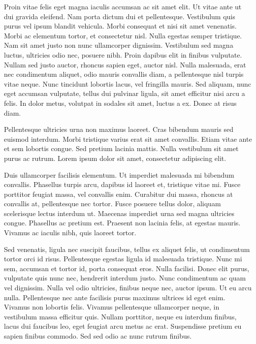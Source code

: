 \documentclass[twocolumn]{IEEEtran}
\begin{document}
Proin vitae felis eget magna iaculis accumsan ac sit amet elit. Ut vitae ante ut dui gravida eleifend. Nam porta dictum dui et pellentesque. Vestibulum quis purus vel ipsum blandit vehicula. Morbi consequat et nisi sit amet venenatis. Morbi ac elementum tortor, et consectetur nisl. Nulla egestas semper tristique. Nam sit amet justo non nunc ullamcorper dignissim. Vestibulum sed magna luctus, ultricies odio nec, posuere nibh. Proin dapibus elit in finibus vulputate. Nullam sed justo auctor, rhoncus sapien eget, auctor nisl. Nulla malesuada, erat nec condimentum aliquet, odio mauris convallis diam, a pellentesque nisl turpis vitae neque. Nunc tincidunt lobortis lacus, vel fringilla mauris. Sed aliquam, nunc eget accumsan vulputate, tellus dui pulvinar ligula, sit amet efficitur nisi arcu a felis. In dolor metus, volutpat in sodales sit amet, luctus a ex. Donec at risus diam.

Pellentesque ultricies urna non maximus laoreet. Cras bibendum mauris sed euismod interdum. Morbi tristique varius erat sit amet convallis. Etiam vitae ante et sem lobortis congue. Sed pretium lacinia mattis. Nulla vestibulum sit amet purus ac rutrum. Lorem ipsum dolor sit amet, consectetur adipiscing elit.

Duis ullamcorper facilisis elementum. Ut imperdiet malesuada mi bibendum convallis. Phasellus turpis arcu, dapibus id laoreet et, tristique vitae mi. Fusce porttitor feugiat massa, vel convallis enim. Curabitur dui massa, rhoncus at convallis at, pellentesque nec tortor. Fusce posuere tellus dolor, aliquam scelerisque lectus interdum ut. Maecenas imperdiet urna sed magna ultricies congue. Phasellus ac pretium est. Praesent non lacinia felis, at egestas mauris. Vivamus ac iaculis nibh, quis laoreet tortor.

Sed venenatis, ligula nec suscipit faucibus, tellus ex aliquet felis, ut condimentum tortor orci id risus. Pellentesque egestas ligula id malesuada tristique. Nunc mi sem, accumsan et tortor id, porta consequat eros. Nulla facilisi. Donec elit purus, vulputate quis nunc nec, hendrerit interdum justo. Nunc condimentum ac quam vel dignissim. Nulla vel odio ultricies, finibus neque nec, auctor ipsum. Ut eu arcu nulla. Pellentesque nec ante facilisis purus maximus ultrices id eget enim. Vivamus non lobortis felis. Vivamus pellentesque ullamcorper neque, in vestibulum massa efficitur quis. Nullam porttitor, neque eu interdum finibus, lacus dui faucibus leo, eget feugiat arcu metus ac erat. Suspendisse pretium eu sapien finibus commodo. Sed sed odio ac nunc rutrum finibus.
\end{document}
